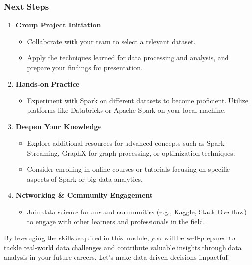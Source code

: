 \documentclass[aspectratio=169]{beamer}
\begin{document}
\begin{frame}[fragile]
    \frametitle{Next Steps}
    \begin{enumerate}
        \item \textbf{Group Project Initiation}
        \begin{itemize}
            \item Collaborate with your team to select a relevant dataset.
            \item Apply the techniques learned for data processing and analysis, and prepare your findings for presentation.
        \end{itemize}

        \item \textbf{Hands-on Practice}
        \begin{itemize}
            \item Experiment with Spark on different datasets to become proficient. Utilize platforms like Databricks or Apache Spark on your local machine.
        \end{itemize}

        \item \textbf{Deepen Your Knowledge}
        \begin{itemize}
            \item Explore additional resources for advanced concepts such as Spark Streaming, GraphX for graph processing, or optimization techniques.
            \item Consider enrolling in online courses or tutorials focusing on specific aspects of Spark or big data analytics.
        \end{itemize}

        \item \textbf{Networking \& Community Engagement}
        \begin{itemize}
            \item Join data science forums and communities (e.g., Kaggle, Stack Overflow) to engage with other learners and professionals in the field.
        \end{itemize}
    \end{enumerate}

    By leveraging the skills acquired in this module, you will be well-prepared to tackle real-world data challenges and contribute valuable insights through data analysis in your future careers. Let’s make data-driven decisions impactful!
\end{frame}
\end{document}
